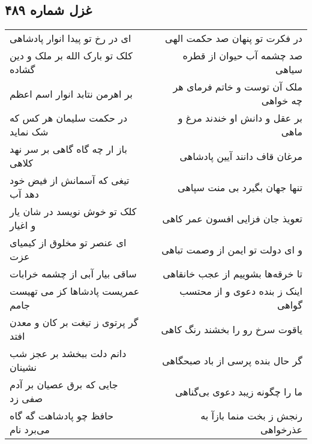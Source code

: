 \begin{center}
\section*{غزل شماره ۴۸۹}
\label{sec:sh489}
\begin{longtable}{l p{0.5cm} r}
ای در رخ تو پیدا انوار پادشاهی
&&
در فکرت تو پنهان صد حکمت الهی
\\
کلک تو بارک الله بر ملک و دین گشاده
&&
صد چشمه آب حیوان از قطره سیاهی
\\
بر اهرمن نتابد انوار اسم اعظم
&&
ملک آن توست و خاتم فرمای هر چه خواهی
\\
در حکمت سلیمان هر کس که شک نماید
&&
بر عقل و دانش او خندند مرغ و ماهی
\\
باز ار چه گاه گاهی بر سر نهد کلاهی
&&
مرغان قاف دانند آیین پادشاهی
\\
تیغی که آسمانش از فیض خود دهد آب
&&
تنها جهان بگیرد بی منت سپاهی
\\
کلک تو خوش نویسد در شان یار و اغیار
&&
تعویذ جان فزایی افسون عمر کاهی
\\
ای عنصر تو مخلوق از کیمیای عزت
&&
و ای دولت تو ایمن از وصمت تباهی
\\
ساقی بیار آبی از چشمه خرابات
&&
تا خرقه‌ها بشوییم از عجب خانقاهی
\\
عمریست پادشاها کز می تهیست جامم
&&
اینک ز بنده دعوی و از محتسب گواهی
\\
گر پرتوی ز تیغت بر کان و معدن افتد
&&
یاقوت سرخ رو را بخشند رنگ کاهی
\\
دانم دلت ببخشد بر عجز شب نشینان
&&
گر حال بنده پرسی از باد صبحگاهی
\\
جایی که برق عصیان بر آدم صفی زد
&&
ما را چگونه زیبد دعوی بی‌گناهی
\\
حافظ چو پادشاهت گه گاه می‌برد نام
&&
رنجش ز بخت منما بازآ به عذرخواهی
\\
\end{longtable}
\end{center}
